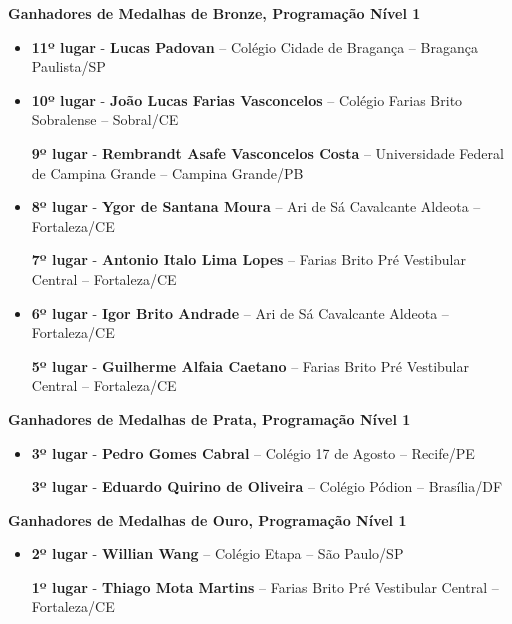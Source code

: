 \documentclass{article}
\begin{document}
\textbf{\color{blue}Ganhadores de Medalhas de Bronze, \color{black}Programação Nível 1}
\color{black}

\begin{itemize}
\item
\textbf{11º lugar} - \textbf{Lucas Padovan} – Colégio Cidade de Bragança – Bragança Paulista/SP



\item
\textbf{10º lugar} - \textbf{João Lucas Farias Vasconcelos} – Colégio Farias Brito Sobralense – Sobral/CE


\textbf{9º lugar} - \textbf{Rembrandt Asafe Vasconcelos Costa} – Universidade Federal de Campina Grande – Campina Grande/PB



\item
\textbf{8º lugar} - \textbf{Ygor de Santana Moura} – Ari de Sá Cavalcante Aldeota – Fortaleza/CE


\textbf{7º lugar} - \textbf{Antonio Italo Lima Lopes} – Farias Brito Pré Vestibular Central – Fortaleza/CE



\item
\textbf{6º lugar} - \textbf{Igor Brito Andrade} – Ari de Sá Cavalcante Aldeota – Fortaleza/CE


\textbf{5º lugar} - \textbf{Guilherme Alfaia Caetano} – Farias Brito Pré Vestibular Central – Fortaleza/CE



\end{itemize}

\textbf{\color{blue}Ganhadores de Medalhas de Prata, \color{black}Programação Nível 1}
\color{black}

\begin{itemize}
\item
\textbf{3º lugar} - \textbf{Pedro Gomes Cabral} – Colégio 17 de Agosto – Recife/PE


\textbf{3º lugar} - \textbf{Eduardo Quirino de Oliveira} – Colégio Pódion – Brasília/DF



\end{itemize}

\textbf{\color{blue}Ganhadores de Medalhas de Ouro, \color{black}Programação Nível 1}
\color{black}

\begin{itemize}
\item
\textbf{2º lugar} - \textbf{Willian Wang} – Colégio Etapa – São Paulo/SP


\textbf{1º lugar} - \textbf{Thiago Mota Martins} – Farias Brito Pré Vestibular Central – Fortaleza/CE



\end{itemize}
\end{document}
